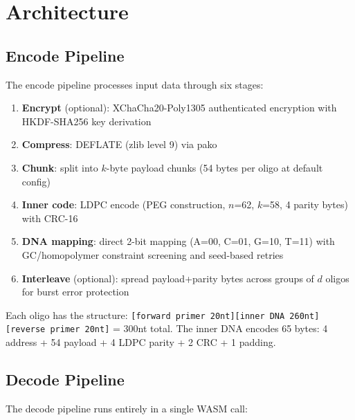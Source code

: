 \documentclass[11pt,a4paper]{article}
\begin{document}
\section{Architecture}

\subsection{Encode Pipeline}

The encode pipeline processes input data through six stages:

\begin{enumerate}[noitemsep]
\item \textbf{Encrypt} (optional): XChaCha20-Poly1305 authenticated encryption with HKDF-SHA256 key derivation
\item \textbf{Compress}: DEFLATE (zlib level 9) via pako
\item \textbf{Chunk}: split into $k$-byte payload chunks (54 bytes per oligo at default config)
\item \textbf{Inner code}: LDPC encode (PEG construction, $n$=62, $k$=58, 4 parity bytes) with CRC-16
\item \textbf{DNA mapping}: direct 2-bit mapping (A=00, C=01, G=10, T=11) with GC/homopolymer constraint screening and seed-based retries
\item \textbf{Interleave} (optional): spread payload+parity bytes across groups of $d$ oligos for burst error protection
\end{enumerate}

Each oligo has the structure: \texttt{[forward primer 20nt][inner DNA 260nt][reverse primer 20nt]} = 300nt total. The inner DNA encodes 65 bytes: 4 address + 54 payload + 4 LDPC parity + 2 CRC + 1 padding.

\subsection{Decode Pipeline}

The decode pipeline runs entirely in a single WASM call:
\end{document}
